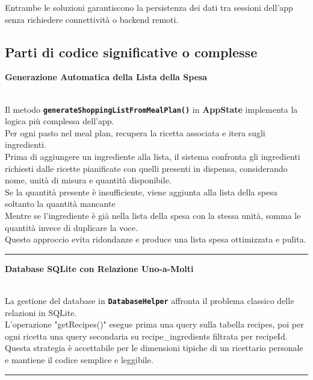\documentclass[a4paper, 12pt]{article}
\begin{document}
Entrambe le soluzioni garantiscono la persistenza dei dati tra sessioni dell’app senza richiedere connettività o backend remoti.

\newpage
\subsection{Parti di codice significative o complesse}
{\color{ForestGreen}\raggedright{\textbf{Generazione Automatica della Lista della Spesa}}}\\
Il metodo \textbf{\texttt{generateShoppingListFromMealPlan()}} in \textbf{AppState} implementa la logica più complessa dell’app. \\
Per ogni pasto nel meal plan, recupera la ricetta associata e itera sugli ingredienti.\\
Prima di aggiungere un ingrediente alla lista, il sistema confronta gli ingredienti richiesti dalle ricette pianificate con quelli presenti in dispensa, considerando nome, unità di misura e quantità disponibile.\\
Se la quantità presente è insufficiente, viene aggiunta alla lista della spesa soltanto la quantità mancante\\
Mentre se l’ingrediente è già nella lista della spesa con la stessa unità, somma le quantità invece di duplicare la voce. \\
Questo approccio evita ridondanze e produce una lista spesa ottimizzata e pulita.
\newline

\vspace{0.5 cm}
\hrule
\vspace{0.5 cm}

{\color{ForestGreen}\raggedright{\textbf{Database SQLite con Relazione Uno-a-Molti}}}\\
La gestione del database in \textbf{\texttt{DatabaseHelper}} affronta il problema classico delle relazioni in SQLite. \\
L’operazione "getRecipes()" esegue prima una query sulla tabella recipes, poi per ogni ricetta una query secondaria su recipe\_ingredients filtrata per recipeId. \\
Questa strategia è accettabile per le dimensioni tipiche di un ricettario personale e mantiene il codice semplice e leggibile.
\newline

\vspace{0.5 cm}
\hrule
\vspace{0.5 cm}
\end{document}

